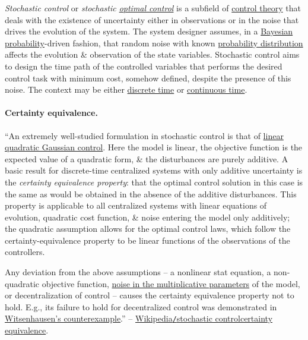 \documentclass{article}
\begin{document}
{\it Stochastic control} or {\it stochastic \href{https://en.wikipedia.org/wiki/Optimal_control}{optimal control}} is a subfield of \href{https://en.wikipedia.org/wiki/Control_theory}{control theory} that deals with the existence of uncertainty either in observations or in the noise that drives the evolution of the system. The system designer assumes, in a \href{https://en.wikipedia.org/wiki/Bayesian_probability}{Bayesian probability}-driven fashion, that random noise with known \href{https://en.wikipedia.org/wiki/Probability_distribution}{probability distribution} affects the evolution \& observation of the state variables. Stochastic control aims to design the time path of the controlled variables that performs the desired control task with minimum cost, somehow defined, despite the presence of this noise. The context may be either \href{https://en.wikipedia.org/wiki/Discrete_time}{discrete time} or \href{https://en.wikipedia.org/wiki/Continuous_time}{continuous time}.

\paragraph{Certainty equivalence.} ``An extremely well-studied formulation in stochastic control is that of \href{https://en.wikipedia.org/wiki/Linear_quadratic_Gaussian_control}{linear quadratic Gaussian control}. Here the model is linear, the objective function is the expected value of a quadratic form, \& the disturbances are purely additive. A basic result for discrete-time centralized systems with only additive uncertainty is the {\it certainty equivalence property}: that the optimal control solution in this case is the same as would be obtained in the absence of the additive disturbances. This property is applicable to all centralized systems with linear equations of evolution, quadratic cost function, \& noise entering the model only additively; the quadratic assumption allows for the optimal control laws, which follow the certainty-equivalence property to be linear functions of the observations of the controllers.

Any deviation from the above assumptions -- a nonlinear stat equation, a non-quadratic objective function, \href{https://en.wikipedia.org/wiki/Multiplier_uncertainty}{noise in the multiplicative parameters} of the model, or decentralization of control -- causes the certainty equivalence property not to hold. E.g., its failure to hold for decentralized control was demonstrated in \href{https://en.wikipedia.org/wiki/Witsenhausen%27s_counterexample}{Witsenhausen's counterexample}.'' -- \href{https://en.wikipedia.org/wiki/Stochastic_control#Certainty_equivalence}{Wikipedia{\tt/}stochastic control{\tt}certainty equivalence}.
\end{document}
